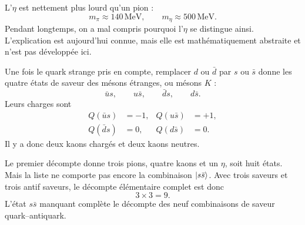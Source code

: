 L’\(\eta\) est nettement plus lourd qu’un pion :
\begin{equation}
m_\pi \approx 140\,\mathrm{MeV},
\qquad
m_\eta \approx 500\,\mathrm{MeV}.
\end{equation}
Pendant longtemps, on a mal compris pourquoi l’\(\eta\) se distingue ainsi. L’explication est aujourd’hui connue, mais elle est mathématiquement abstraite et n’est pas développée ici.

\begin{classroomqa}
\end{classroomqa}

\begin{classroomqa}
\end{classroomqa}

\begin{classroomqa}
\end{classroomqa}

Une fois le quark strange pris en compte, remplacer \(d\) ou \(\bar d\) par \(s\) ou \(\bar s\) donne les quatre états de saveur des mésons étranges, ou mésons \(K\) :
\begin{equation}
\bar u s,\qquad u\bar s,\qquad \bar d s,\qquad d\bar s.
\end{equation}
Leurs charges sont
\begin{align}
Q(\bar u s) &=-1,
&
Q(u\bar s) &=+1,
\\
Q(\bar d s) &=0,
&
Q(d\bar s) &=0.
\end{align}
Il y a donc deux kaons chargés et deux kaons neutres.

Le premier décompte donne trois pions, quatre kaons et un \(\eta\), soit huit états. Mais la liste ne comporte pas encore la combinaison \(\left\lvert s\bar s\right\rangle\). Avec trois saveurs et trois antif saveurs, le décompte élémentaire complet est donc
\begin{equation}
3\times3=9.
\end{equation}
L’état \(s\bar s\) manquant complète le décompte des neuf combinaisons de saveur quark--antiquark.
